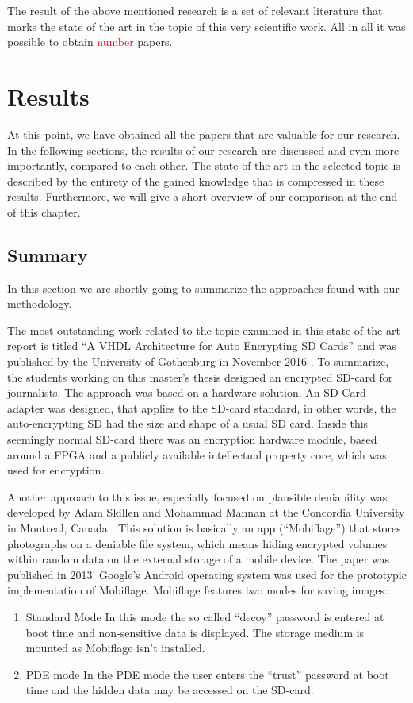 \documentclass[12pt,a4paper,titlepage,oneside]{scrartcl}
\newcommand\todo[1]{\textcolor{red}{#1}}
\begin{document}
The result of the above mentioned research is a set of relevant literature that marks the state of the art in the topic of this very scientific work.
All in all it was possible to obtain \todo{number} papers.

\section{Results}
At this point, we have obtained all the papers that are valuable for our research.
In the following sections, the results of our research are discussed and even more importantly, compared to each other.
The state of the art in the selected topic is described by the entirety of the gained knowledge that is compressed in these results.
Furthermore, we will give a short overview of our comparison at the end of this chapter.

\subsection{Summary}
In this section we are shortly going to summarize the approaches found with our methodology.

The most outstanding work related to the topic examined in this state of the art report is titled ``A VHDL Architecture for Auto Encrypting SD Cards'' and was published by the University of Gothenburg in November 2016 \cite{Davidsson2016}.
To summarize, the students working on this master's thesis designed an encrypted SD-card for journalists.
The approach was based on a hardware solution.
An SD-Card adapter was designed, that applies to the SD-card standard, in other words, the auto-encrypting SD had the size and shape of a usual SD card.
Inside this seemingly normal SD-card there was an encryption hardware module, based around a FPGA and a publicly available intellectual property core, which was used for encryption.

Another approach to this issue, especially focused on plausible deniability was developed by Adam Skillen and Mohammad Mannan at the Concordia University in Montreal, Canada \cite{skillen2013implementing}.
This solution is basically an app (``Mobiflage'') that stores photographs on a deniable file system, which means hiding encrypted volumes within random data on the external storage of a mobile device.
The paper was published in 2013.
Google's Android operating system was used for the prototypic implementation of Mobiflage.
Mobiflage features two modes for saving images: 
\begin{enumerate}
  \item Standard Mode
  In this mode the so called ``decoy'' password is entered at boot time and non-sensitive data is displayed.
  The storage medium is mounted as Mobiflage isn't installed.
  \item PDE mode
  In the PDE mode the user enters the ``trust'' password at boot time and the hidden data may be accessed on the SD-card.
\end{enumerate}
\end{document}
